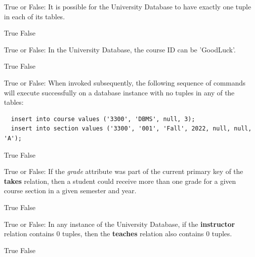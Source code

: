 \documentclass[12pt,answers]{exam}
\begin{document}
\begin{questions}
\begin{minipage}{\linewidth}
\question[2]
True or False: It is possible for the University Database to have exactly one tuple in each of its tables.
\begin{checkboxes}
    \CorrectChoice True
    \choice False
\end{checkboxes}
\end{minipage}

\begin{minipage}{\linewidth}
\question[2]
True or False: In the University Database, the course ID can be 'GoodLuck'.
\begin{checkboxes}
    \CorrectChoice True
    \choice False
\end{checkboxes}
\end{minipage}

\begin{minipage}{\linewidth}
\question[2]
True or False: When invoked subsequently, the following sequence of commands will execute successfully on a database instance with no tuples in any of the tables:
\begin{verbatim}
  insert into course values ('3300', 'DBMS', null, 3);
  insert into section values ('3300', '001', 'Fall', 2022, null, null, 'A');
\end{verbatim}
\begin{checkboxes}
    \CorrectChoice True
    \choice False
\end{checkboxes}
\end{minipage}

\begin{minipage}{\linewidth}
\question[3]
True or False: If the \textit{grade} attribute was part of the current primary key of the \textbf{takes} relation, 
then a student could receive more than one grade for a given course section in a given semester and year.
\begin{checkboxes}
    \CorrectChoice True
    \choice False
\end{checkboxes}
\end{minipage}

\begin{minipage}{\linewidth}
\question[2]
True or False: In any instance of the University Database, if the \textbf{instructor} relation contains 0 tuples, then the \textbf{teaches} relation also contains 0 tuples.
\begin{checkboxes}
    \CorrectChoice True
    \choice False
\end{checkboxes}
\end{minipage}


\end{questions}
\end{document}
